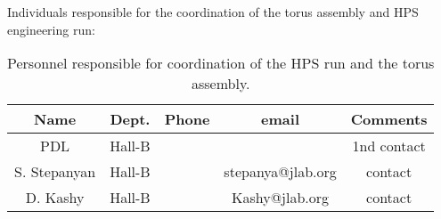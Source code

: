 Individuals responsible for the coordination of the torus assembly and HPS engineering run:

\begin{table}[!htb]
 \centering
 \begin{tabular}{|c|c|c|c|c|}
\hline
 Name&Dept.&Phone&email&Comments \\ \hline
PDL & Hall-B&&&1nd contact \\ \hline
S. Stepanyan & Hall-B&&stepanya@jlab.org&contact \\ \hline
D. Kashy & Hall-B&&Kashy@jlab.org&contact \\ \hline
 \end{tabular}
\caption{ Personnel responsible for coordination of the HPS run and the torus assembly.} 
\label{tb:beam}
\end{table}

